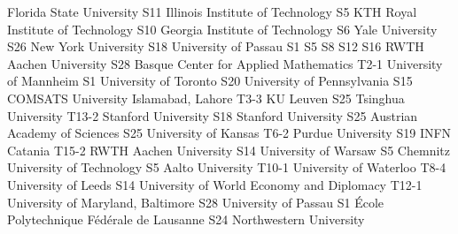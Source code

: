 \begin{multicols}{2}
{Florida State University}
{S11}
{}
{}
{}
{}
{}
{}
{Illinois Institute of Technology}
{S5}
{}
{}
{}
{}
{}
{}
{KTH Royal Institute of Technology}
{S10}
{}
{}
{}
{}
{}
{}
{Georgia Institute of Technology}
{S6}
{}
{}
{}
{}
{}
{}
{Yale University}
{S26}
{}
{}
{}
{}
{}
{}
{New York University}
{S18}
{}
{}
{}
{}
{}
{}
{University of Passau}
{S1}
{S5}
{S8}
{S12}
{S16}
{}
{}
{RWTH Aachen University}
{S28}
{}
{}
{}
{}
{}
{}
{Basque Center for Applied Mathematics}
{T2-1}
{}
{}
{}
{}
{}
{}
{University of Mannheim}
{S1}
{}
{}
{}
{}
{}
{}
{University of Toronto}
{S20}
{}
{}
{}
{}
{}
{}
{University of Pennsylvania}
{S15}
{}
{}
{}
{}
{}
{}
{COMSATS University Islamabad, Lahore}
{T3-3}
{}
{}
{}
{}
{}
{}
{KU Leuven}
{S25}
{}
{}
{}
{}
{}
{}
{Tsinghua University}
{T13-2}
{}
{}
{}
{}
{}
{}
{Stanford University}
{S18}
{}
{}
{}
{}
{}
{}
{Stanford University}
{S25}
{}
{}
{}
{}
{}
{}
{Austrian Academy of Sciences}
{S25}
{}
{}
{}
{}
{}
{}
{University of Kansas}
{T6-2}
{}
{}
{}
{}
{}
{}
{Purdue University}
{S19}
{}
{}
{}
{}
{}
{}
{INFN Catania}
{T15-2}
{}
{}
{}
{}
{}
{}
{RWTH Aachen University}
{S14}
{}
{}
{}
{}
{}
{}
{University of Warsaw}
{S5}
{}
{}
{}
{}
{}
{}
{Chemnitz University of Technology}
{S5}
{}
{}
{}
{}
{}
{}
{Aalto University}
{T10-1}
{}
{}
{}
{}
{}
{}
{University of Waterloo}
{T8-4}
{}
{}
{}
{}
{}
{}
{University of Leeds}
{S14}
{}
{}
{}
{}
{}
{}
{University of World Economy and Diplomacy}
{T12-1}
{}
{}
{}
{}
{}
{}
{University of Maryland, Baltimore}
{S28}
{}
{}
{}
{}
{}
{}
{University of Passau}
{S1}
{}
{}
{}
{}
{}
{}
{École Polytechnique Fédérale de Lausanne}
{S24}
{}
{}
{}
{}
{}
{}
{Northwestern University}

\end{multicols}

